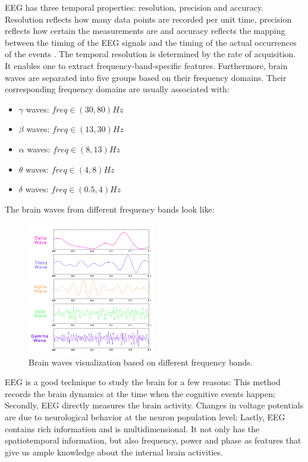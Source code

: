 \documentclass[a4paper,11pt,oneside]{article}
\begin{document}
EEG has three temporal properties: resolution, precision and accuracy. Resolution reflects how many  data points are recorded per unit time, precision reflects how certain the measurements are and accuracy reflects the mapping between the timing of the EEG signals and the timing of the actual occurrences of the events \cite{cohen2014analyzing}. The temporal resolution is determined by the rate of acquisition. It enables one to extract frequency-band-specific features. Furthermore, brain waves are separated into five groups based on their frequency domains. Their corresponding frequency domains are usually associated with:
\begin{itemize}
	\item $  \gamma $ waves: $freq \in (30, 80) Hz$
	\item $ \beta $ waves: $freq \in (13, 30) Hz$
	\item $ \alpha $ waves: $freq \in (8, 13) Hz$
	\item $ \theta $ waves: $freq \in (4, 8) Hz$
	\item $ \delta $ waves: $freq \in (0.5, 4) Hz$
\end{itemize}
The brain waves from different frequency bands look like:

\begin{figure}[h]
	\centering
	\includegraphics[width=0.5\textwidth]{img/waves}
	\caption[Caption for LOF]{Brain waves visualization based on different frequency bands.\footnotemark}
\end{figure}
EEG is a good technique to study the brain for a few reasons: This method records the brain dynamics at the time when the cognitive events happen; Secondly, EEG directly measures the brain activity. Changes in voltage potentials are due to neurological behavior at the neuron population level; Lastly, EEG contains rich information and is multidimensional. It not only has the spatiotemporal information, but also frequency, power and phase as features that give us ample knowledge about the internal brain activities. \cite{cohen2011s}
\end{document}
